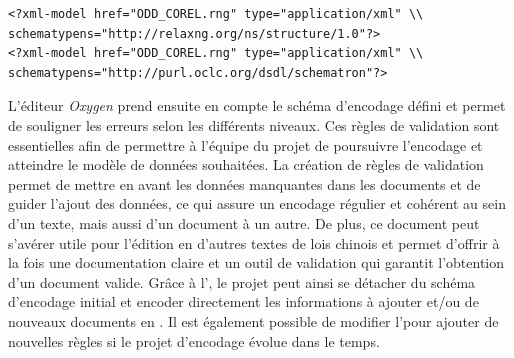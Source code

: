 \begin{verbatim}
<?xml-model href="ODD_COREL.rng" type="application/xml" \\ schematypens="http://relaxng.org/ns/structure/1.0"?>
<?xml-model href="ODD_COREL.rng" type="application/xml" \\ schematypens="http://purl.oclc.org/dsdl/schematron"?>
\end{verbatim}

L'éditeur \textit{Oxygen} prend ensuite en compte le schéma d'encodage défini et permet de souligner les erreurs selon les différents niveaux. Ces règles de validation sont essentielles afin de permettre à l'équipe du projet de poursuivre l'encodage et atteindre le modèle de données souhaitées. La création de règles de validation permet de mettre en avant les données manquantes dans les documents et de guider l'ajout des données, ce qui assure un encodage régulier et cohérent au sein d'un texte, mais aussi d'un document à un autre. De plus, ce document peut s'avérer utile pour l'édition en \TEI d'autres textes de lois chinois et permet d'offrir à la fois une documentation claire et un outil de validation qui garantit l'obtention d'un document valide. Grâce à l'\ODD, le projet \COREL peut ainsi se détacher du schéma d'encodage \LSC initial et encoder directement les informations à ajouter et/ou de nouveaux documents en \TEI. Il est également possible de modifier l'\ODD pour ajouter de nouvelles règles si le projet d'encodage évolue dans le temps. 
